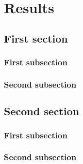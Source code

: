 \chapter{Results}\label{chapter:results}
\thispagestyle{chapterBeginStyle}

\section{First section}
\subsection{First subsection}
\subsection{Second subsection}

\section{Second section}
\subsection{First subsection}
\subsection{Second subsection}